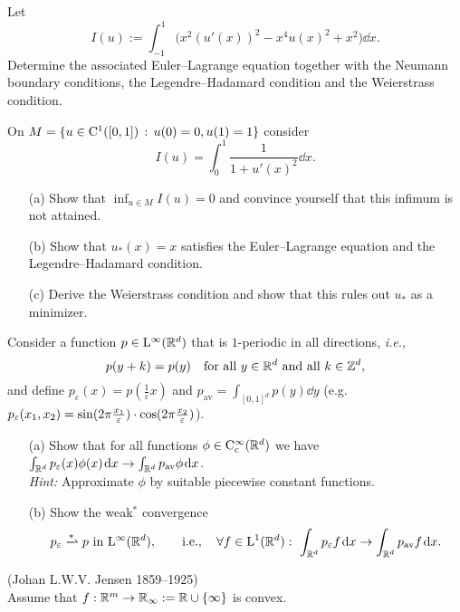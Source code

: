 \documentclass[12pt,a4paper]{article}
\begin{document}

\setcounter{AUFGABE}{10}


Let 
\[
I(u):=\int_{-1}^1 \big (x^2(u'(x))^2-x^4u(x)^2+x^2 \big)
\dd x.
\]
Determine the associated Euler--Lagrange equation
together with
the Neumann boundary conditions,
the Legendre--Hadamard condition
and the Weierstrass condition.

On $M=\{u\in {\mathrm C}^1([0,1])\,:\,u(0)=0, u(1)=1\}$ consider
\[
I(u) = \int_0^1\frac{1}{1+u'(x)^2}\dd x.
\]
\begin{itemize}
\item [(a)] Show that $\inf_{u\in M} I(u) = 0$ 
and convince yourself that this infimum is not attained.

\item[(b)] Show that $u_*(x) = x$ satisfies the Euler--Lagrange equation and the Legendre--Hadamard
condition.

\item[(c)] Derive the Weierstrass condition and show that this rules out $u_*$ as a minimizer.
\end{itemize}

Consider a function $p\in {\mathrm L}^\infty({\mathbb R}^d)$
that is $1$-periodic in all directions,
\textit{i.e.},
\[
p(y+k)=p(y) \quad \text{for all }y\in{\mathbb R}^d \text{ and all }k\in{\mathbb Z}^d,
\]
and define $p_\varepsilon(x)=p(\frac{1}{\varepsilon}x)$
and $p_{\mathrm{av}}=\int_{[0,1]^d}p(y)\dd y$ (e.g. $p_\varepsilon(x_1,x_2)=\sin(2\pi \tfrac{ x_1}{\varepsilon})\cdot\cos(2\pi \tfrac{ x_2}{\varepsilon})$).
\begin{enumerate}
    \item[(a)]
    Show that for all functions $\phi\in{\mathrm C}_{{\mathrm c}}^\infty({\mathbb R}^d)$
    we have $\int_{{\mathbb R}^d}p_\varepsilon(x)\phi(x)\;\!\mathrm{d} x\to \int_{{\mathbb R}^d}p_{\mathrm{av}}\phi\;\!\mathrm{d} x$.
    \\
    \textit{Hint:} Approximate $\phi$ by suitable piecewise constant functions.
    \item[(b)]
    Show the weak$^\ast$ convergence 
    \[
    p_\varepsilon\xrightharpoonup{\ast} p \text{ in } \rmL^\infty(\R^d),
    \qquad
    \text{i.e.},
    \quad \forall f\in\rmL^1(\R^d): \ 
    \int_{\R^d}p_\varepsilon f\dd x \to \int_{\R^d}p_{\mathrm{av}}f\dd x.
    \]
\end{enumerate}

 {\footnotesize  (Johan L.W.V. Jensen
1859--1925)}\\
Assume that $f:{\mathbb R}^m\to {\mathbb R}_\infty:={\mathbb R}\cup\{\infty\}$ is convex. 
\end{document}
